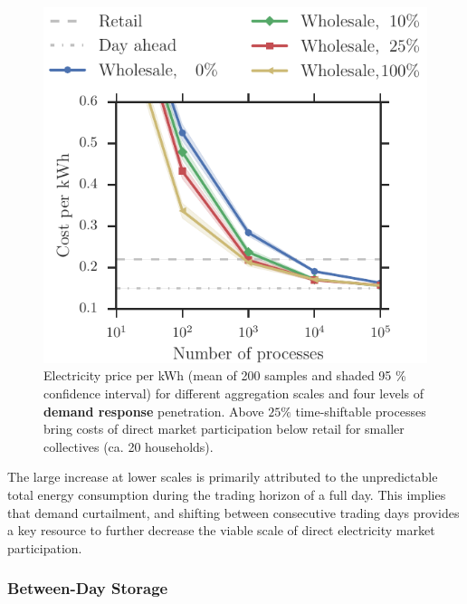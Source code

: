 \documentclass[conference]{IEEEtran}
\begin{document}
\begin{figure}[!t]
\centering
\includegraphics[width=0.9\columnwidth]{figures/Wholesale_flex.pdf}
\caption{Electricity price per kWh (mean of 200 samples and shaded 95 \% confidence interval) for different aggregation scales and four levels of \textbf{demand response} penetration. Above $25 \%$ time-shiftable processes bring costs of direct market participation below retail for smaller collectives (ca. 20 households).}
\label{fig:wholesale_flex}
\end{figure}


The large increase at lower scales is primarily attributed to the unpredictable total energy consumption during the trading horizon of a full day. This implies that demand curtailment, and shifting between consecutive trading days provides a key resource to further decrease the viable scale of direct electricity market participation.

\subsubsection{Between-Day Storage}
\end{document}
